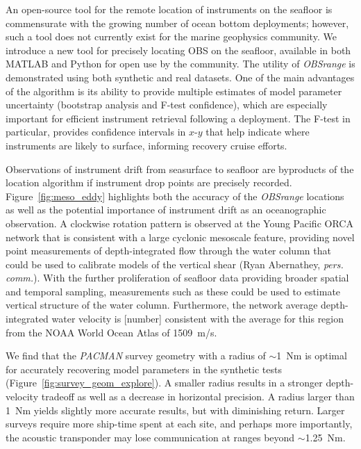 An open-source tool for the remote location of instruments on the seafloor is commensurate with the growing number of ocean bottom deployments; however, such a tool does not currently exist for the marine geophysics community. We introduce a new tool for precisely locating OBS on the seafloor, available in both MATLAB and Python for open use by the community. The utility of \textit{OBSrange} is demonstrated using both synthetic and real datasets. One of the main advantages of the algorithm is its ability to provide multiple estimates of model parameter uncertainty (bootstrap analysis and F-test confidence), which are especially important for efficient instrument retrieval following a deployment. The F-test in particular, provides confidence intervals in $x$-$y$ that help indicate where instruments are likely to surface, informing recovery cruise efforts.

Observations of instrument drift from seasurface to seafloor are byproducts of the location algorithm if instrument drop points are precisely recorded. Figure~\ref{fig:meso_eddy} highlights both the accuracy of the \textit{OBSrange} locations as well as the potential importance of instrument drift as an oceanographic observation. A clockwise rotation pattern is observed at the Young Pacific ORCA network that is consistent with a large cyclonic mesoscale feature, providing novel point measurements of depth-integrated flow through the water column that could be used to calibrate models of the vertical shear (Ryan Abernathey, \textit{pers. comm.}). With the further proliferation of seafloor data providing broader spatial and temporal sampling, measurements such as these could be used to estimate vertical structure of the water column. Furthermore, the network average depth-integrated water velocity is [number] consistent with the average for this region from the NOAA World Ocean Atlas of 1509~m/s.

We find that the \textit{PACMAN} survey geometry with a radius of $\sim$1~Nm is optimal for accurately recovering model parameters in the synthetic tests (Figure~\ref{fig:survey_geom_explore}). A smaller radius results in a stronger depth-velocity tradeoff as well as a decrease in horizontal precision. A radius larger than 1~Nm yields slightly more accurate results, but with diminishing return. Larger surveys require more ship-time spent at each site, and perhaps more importantly, the acoustic transponder may lose communication at ranges beyond $\sim$1.25~Nm.

